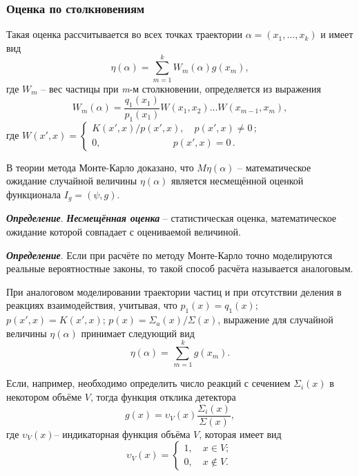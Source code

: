 \documentclass[
11pt,
master, %
subf, %
href, %
colorlinks=true, %
]{disser}
\begin{document}
\subsubsection{Оценка по столкновениям}
 Такая оценка рассчитывается во всех точках траектории $\alpha =(x_{1} ,\ldots ,x_{k} )$ и имеет вид
\begin{equation} \label{GrindEQ__19_}
\eta (\alpha )=\sum\limits_{m=1}^{k}W_{m}  (\alpha )g(x_{m} ),
\end{equation}
где $W_{m} $ -- вес частицы при \textit{m}-м столкновении, определяется из выражения
\begin{equation} \label{GrindEQ__20_}
W_{m} (\alpha )=\frac{q_{1} (x_{1} )}{p_{1} (x_{1} )} W(x_{1} ,x_{2} )\ldots W(x_{m-1} ,x_{m} ),
\end{equation}
где  $W(x',x)=\left\{\begin{array}{l} {K(x',x)/p(x',x),\quad p(x',x)\ne 0\, ;} \\ {0,\quad \quad \quad \quad \quad \quad \quad ~~ p(x',x)=0\, .} \end{array}\right. $

В теории метода Монте-Карло доказано, что $M\eta (\alpha )$ -- математическое ожидание случайной величины $\eta (\alpha )$ является несмещённой оценкой функционала $I_{g} =(\psi ,g)$.

\textbf{\textit{Определение}}. \textbf{\textit{Несмещённая оценка}} -- статистическая оценка, математическое ожидание которой совпадает с оцениваемой величиной.

\textbf{\textit{Определение}}. Если при расчёте по методу Монте-Карло точно моделируются реальные вероятностные законы, то такой способ расчёта называется аналоговым.

При аналоговом моделировании траектории частиц и при отсутствии деления в реакциях взаимодействия, учитывая, что $p_{1} (x)=q_{1} (x)$; $p(x',x)=K(x',x)$; $p(x)=\Sigma _{a} (x)/\Sigma (x)$, выражение для случайной величины $\eta (\alpha )$ принимает следующий вид\textbf{\textit{}}
\begin{equation} \label{GrindEQ__21_}
\eta (\alpha )=\sum _{\, m=1}^{\, k}g(x_{m} ) .
\end{equation}

Если, например, необходимо определить число реакций с сечением $\Sigma _{i} (x)$ в некотором объёме $V$, тогда функция отклика детектора
\[g(x)=\upsilon _{V} (x) \frac{\Sigma _{i} (x)}{\Sigma (x)} ,\]
где $\upsilon _{V} (x)$-- индикаторная функция объёма $V$, которая имеет вид
\[\upsilon _{V} (x)=\left\{\begin{array}{l} {1,\quad x\in V;} \\ {0,\quad x\notin V.} \end{array}\right. \]
\end{document}
